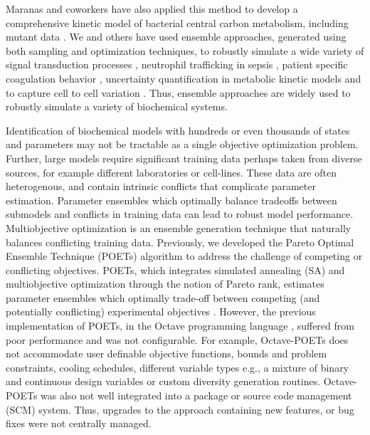 \documentclass{bmcart}
\begin{document}
Maranas and coworkers have also applied this method to develop a comprehensive kinetic model of bacterial central carbon metabolism,
including mutant data \cite{Khodayari:2014aa}.
We and others have used ensemble approaches, generated using both sampling and optimization techniques,
to robustly simulate a wide variety of signal transduction processes \citep{Luan:2007aa,Song:2009aa,Tasseff:2010aa,Tasseff:2011aa,Nayak:2011aa}, neutrophil trafficking in sepsis \cite{Song:2012aa},
patient specific coagulation behavior \cite{Luan:2010aa}, uncertainty quantification in metabolic kinetic models \cite{Andreozzi:2016aa} and to capture cell to cell variation \cite{Lequieu:2011aa}.
Thus, ensemble approaches are widely used to robustly simulate a variety of biochemical systems.

Identification of biochemical models with hundreds or even thousands of states and parameters may not be tractable as a single objective optimization problem.
Further, large models require significant training data perhaps taken from diverse sources, for example different laboratories or cell-lines.
These data are often heterogenous, and contain intrinsic conflicts that complicate parameter estimation.
Parameter ensembles which optimally balance tradeoffs between submodels and conflicts in training data can
lead to robust model performance. Multiobjective optimization is an ensemble generation technique that naturally balances conflicting training data.
Previously, we developed the Pareto Optimal Ensemble Technique (POETs) algorithm to address the challenge of competing or conflicting objectives.
POETs, which integrates simulated annealing (SA) and multiobjective optimization through the notion of Pareto rank, estimates parameter ensembles which optimally trade-off between
competing (and potentially conflicting) experimental objectives \cite{Song:2010aa}.
However, the previous implementation of POETs, in the Octave programming language \cite{CITE_Octave}, suffered from poor performance and was not configurable.
For example, Octave-POETs does not accommodate user definable objective functions, bounds and problem constraints, cooling schedules, different variable types e.g., a mixture of binary and continuous design variables or custom diversity generation routines. Octave-POETs was also not well integrated into a package or
source code management (SCM) system. Thus, upgrades to the approach containing new features, or bug fixes were not centrally managed.
\end{document}

